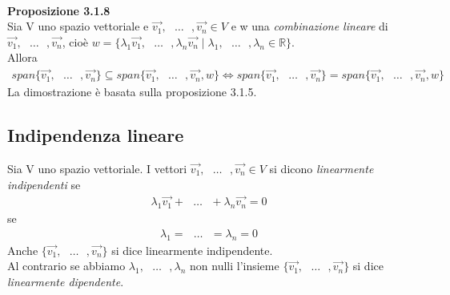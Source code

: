 \documentclass{article}
\begin{document}
\vspace{1em}
\textbf{\\Proposizione 3.1.8}
\\ Sia V uno spazio vettoriale e $\vec{v_1},\text{ }\dots\text{ },\vec{v_n} \in V$ e w una \textit{combinazione lineare} di $\vec{v_1},\text{ }\dots\text{ },\vec{v_n}$, cioè $w=\{\lambda_1\vec{v_1},\text{ }\dots\text{ },\lambda_n\vec{v_n}\mid\lambda_1,\text{ }\dots\text{ },\lambda_n \in \mathbb{R}\}$.
\\ Allora
\begin{align*}
  span\{\vec{v_1},\text{ }\dots\text{ },\vec{v_n}\} \subseteq span\{\vec{v_1},\text{ }\dots\text{ },\vec{v_n},w\} \iff span\{\vec{v_1},\text{ }\dots\text{ },\vec{v_n}\} = span\{\vec{v_1},\text{ }\dots\text{ },\vec{v_n},w\}
\end{align*}
La dimostrazione è basata sulla proposizione 3.1.5.

\pagebreak
\subsection{Indipendenza lineare}
Sia V uno spazio vettoriale. 
I vettori $\vec{v_1},\text{ }\dots\text{ },\vec{v_n} \in V$ si dicono \textit{linearmente indipendenti} se
\begin{align*}
  \lambda_1\vec{v_1}+\text{ }\dots\text{ }+\lambda_n\vec{v_n} = 0
\end{align*}
se
\begin{align*}
  \lambda_1=\text{ }\dots\text{ }=\lambda_n=0
\end{align*}
Anche $\{\vec{v_1},\text{ }\dots\text{ },\vec{v_n}\}$ si dice linearmente indipendente.
\\ Al contrario se abbiamo $\lambda_1,\text{ }\dots\text{ },\lambda_n$ non nulli l'insieme $\{\vec{v_1},\text{ }\dots\text{ },\vec{v_n}\}$ si dice \textit{linearmente dipendente}.
\end{document}
